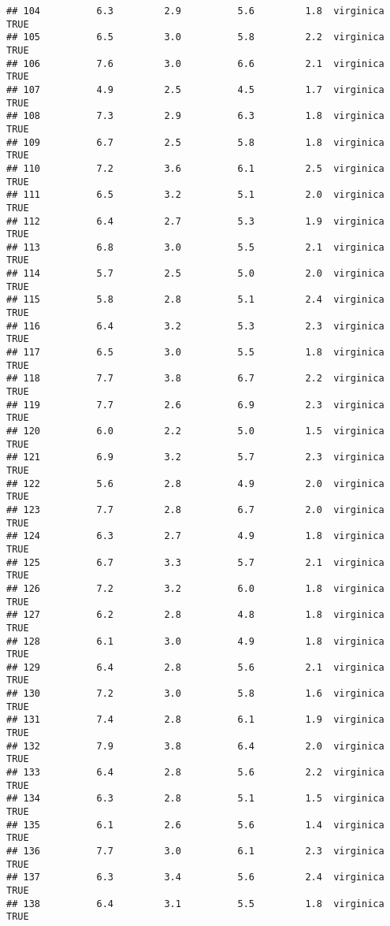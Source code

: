 \documentclass[]{article}
\begin{document}
\begin{verbatim}
## 104          6.3         2.9          5.6         1.8  virginica   TRUE
## 105          6.5         3.0          5.8         2.2  virginica   TRUE
## 106          7.6         3.0          6.6         2.1  virginica   TRUE
## 107          4.9         2.5          4.5         1.7  virginica   TRUE
## 108          7.3         2.9          6.3         1.8  virginica   TRUE
## 109          6.7         2.5          5.8         1.8  virginica   TRUE
## 110          7.2         3.6          6.1         2.5  virginica   TRUE
## 111          6.5         3.2          5.1         2.0  virginica   TRUE
## 112          6.4         2.7          5.3         1.9  virginica   TRUE
## 113          6.8         3.0          5.5         2.1  virginica   TRUE
## 114          5.7         2.5          5.0         2.0  virginica   TRUE
## 115          5.8         2.8          5.1         2.4  virginica   TRUE
## 116          6.4         3.2          5.3         2.3  virginica   TRUE
## 117          6.5         3.0          5.5         1.8  virginica   TRUE
## 118          7.7         3.8          6.7         2.2  virginica   TRUE
## 119          7.7         2.6          6.9         2.3  virginica   TRUE
## 120          6.0         2.2          5.0         1.5  virginica   TRUE
## 121          6.9         3.2          5.7         2.3  virginica   TRUE
## 122          5.6         2.8          4.9         2.0  virginica   TRUE
## 123          7.7         2.8          6.7         2.0  virginica   TRUE
## 124          6.3         2.7          4.9         1.8  virginica   TRUE
## 125          6.7         3.3          5.7         2.1  virginica   TRUE
## 126          7.2         3.2          6.0         1.8  virginica   TRUE
## 127          6.2         2.8          4.8         1.8  virginica   TRUE
## 128          6.1         3.0          4.9         1.8  virginica   TRUE
## 129          6.4         2.8          5.6         2.1  virginica   TRUE
## 130          7.2         3.0          5.8         1.6  virginica   TRUE
## 131          7.4         2.8          6.1         1.9  virginica   TRUE
## 132          7.9         3.8          6.4         2.0  virginica   TRUE
## 133          6.4         2.8          5.6         2.2  virginica   TRUE
## 134          6.3         2.8          5.1         1.5  virginica   TRUE
## 135          6.1         2.6          5.6         1.4  virginica   TRUE
## 136          7.7         3.0          6.1         2.3  virginica   TRUE
## 137          6.3         3.4          5.6         2.4  virginica   TRUE
## 138          6.4         3.1          5.5         1.8  virginica   TRUE

\end{verbatim}
\end{document}
